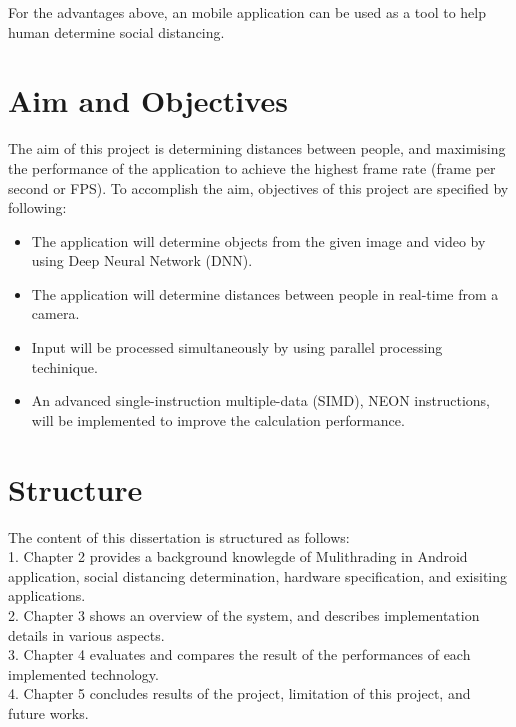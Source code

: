             For the advantages above, an mobile application can be used as a tool to help human determine social distancing.

    \section{Aim and Objectives}
        The aim of this project is determining distances between people,
        and maximising the performance of the application to achieve the highest frame rate (frame per second or FPS).
        To accomplish the aim, objectives of this project are specified by following:
        \begin{itemize}
            \setlength\itemsep{1em}
            \item The application will determine objects from the given image and video by using Deep Neural Network (DNN).
            \item The application will determine distances between people in real-time from a camera.
            \item Input will be processed simultaneously by using parallel processing techinique.
            \item An advanced single-instruction multiple-data (SIMD), NEON instructions, will be implemented to improve the calculation performance.
        \end{itemize}

    \section{Structure}
        The content of this dissertation is structured as follows: \\
        1.	Chapter 2 provides a background knowlegde of Mulithrading in Android application,
            social distancing determination, hardware specification, and exisiting applications. \\
        2.	Chapter 3 shows an overview of the system,
            and describes implementation details in various aspects.  \\
        3.	Chapter 4 evaluates and compares the result of the performances of each implemented technology. \\
        4.	Chapter 5 concludes results of the project, limitation of this project, and future works.  \\
